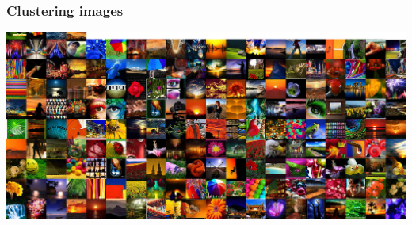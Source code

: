 \begin{frame}
  \frametitle{Clustering images}

  \begin{center}
  \includegraphics[width=\textwidth]{../../code/image_data/flickr_vivid_cluster_0.png}
  \end{center}

\end{frame}
